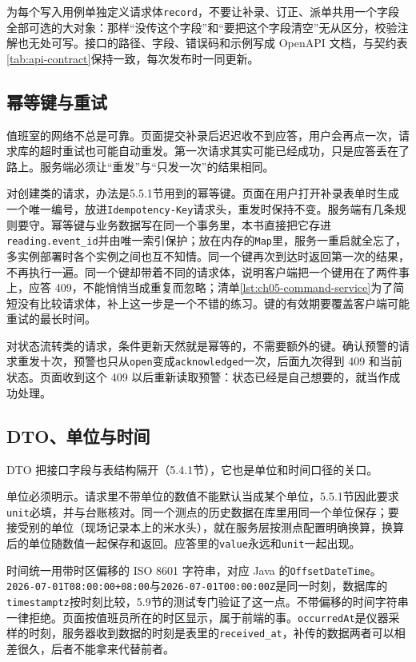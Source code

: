 为每个写入用例单独定义请求体\texttt{record}，不要让补录、订正、派单共用一个字段全部可选的大对象：那样“没传这个字段”和“要把这个字段清空”无从区分，校验注解也无处可写。接口的路径、字段、错误码和示例写成 OpenAPI 文档，与契约表\ref{tab:api-contract}保持一致，每次发布时一同更新。

\subsection{幂等键与重试}

值班室的网络不总是可靠。页面提交补录后迟迟收不到应答，用户会再点一次，请求库的超时重试也可能自动重发。第一次请求其实可能已经成功，只是应答丢在了路上。服务端必须让“重发”与“只发一次”的结果相同。

对创建类的请求，办法是5.5.1节用到的幂等键。页面在用户打开补录表单时生成一个唯一编号，放进\texttt{Idempotency-Key}请求头，重发时保持不变。服务端有几条规则要守。幂等键与业务数据写在同一个事务里，本书直接把它存进\texttt{reading.event\_id}并由唯一索引保护；放在内存的\texttt{Map}里，服务一重启就全忘了，多实例部署时各个实例之间也互不知情。同一个键再次到达时返回第一次的结果，不再执行一遍。同一个键却带着不同的请求体，说明客户端把一个键用在了两件事上，应答 409，不能悄悄当成重复而忽略；清单\ref{lst:ch05-command-service}为了简短没有比较请求体，补上这一步是一个不错的练习。键的有效期要覆盖客户端可能重试的最长时间。

对状态流转类的请求，条件更新天然就是幂等的，不需要额外的键。确认预警的请求重发十次，预警也只从\texttt{open}变成\texttt{acknowledged}一次，后面九次得到 409 和当前状态。页面收到这个 409 以后重新读取预警：状态已经是自己想要的，就当作成功处理。

\subsection{DTO、单位与时间}

DTO 把接口字段与表结构隔开（5.4.1节），它也是单位和时间口径的关口。

单位必须明示。请求里不带单位的数值不能默认当成某个单位，5.5.1节因此要求\texttt{unit}必填，并与台账核对。同一个测点的历史数据在库里用同一个单位保存；要接受别的单位（现场记录本上的米水头），就在服务层按测点配置明确换算，换算后的单位随数值一起保存和返回。应答里的\texttt{value}永远和\texttt{unit}一起出现。

时间统一用带时区偏移的 ISO 8601 字符串，对应 Java 的\texttt{OffsetDateTime}。\texttt{2026-07-01T08:00:00+08:00}与\texttt{2026-07-01T00:00:00Z}是同一时刻，数据库的\texttt{timestamptz}按时刻比较，5.9节的测试专门验证了这一点。不带偏移的时间字符串一律拒绝。页面按值班员所在的时区显示，属于前端的事。\texttt{occurredAt}是仪器采样的时刻，服务器收到数据的时刻是表里的\texttt{received\_at}，补传的数据两者可以相差很久，后者不能拿来代替前者。

